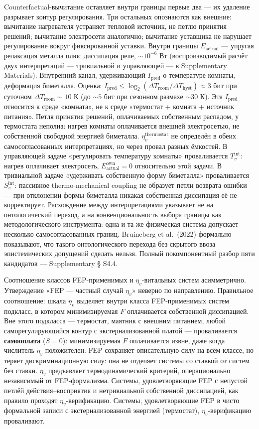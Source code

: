 \documentclass[pdflatex,sn-mathphys-ay]{sn-jnl}
\begin{document}
Counterfactual-вычитание оставляет внутри границы первые два --- их удаление разрывает контур регулирования. Три остальных опознаются как внешние: вычитание нагревателя устраняет тепловой источник, не петлю принятия решений; вычитание электросети аналогично; вычитание уставщика не нарушает регулирование вокруг фиксированной уставки. Внутри границы \(E_{\text{actual}}\) --- упругая релаксация металла плюс диссипация реле, \(\sim 10^{-6}\) Вт (воспроизводимый расчёт двух интерпретаций --- тривиальной и управляющей --- в Supplementary Materials). Внутренний канал, удерживающий \(I_{\text{pred}}\) о температуре комнаты, --- деформация биметалла. Оценка: \(I_{\text{pred}} \le \log_2(\Delta T_{\text{room}}/\Delta T_{\text{hyst}}) \approx 3\) бит при суточном \(\Delta T_{\text{room}} \sim 10\) К (до \(\sim 5\) бит при сезонном размахе \(\sim 30\) К). Эта \(I_{\text{pred}}\) относится к среде «комната», не к среде «термостат + комната + источник питания». Петля принятия решений, оплачиваемых собственным распадом, у термостата неполна: нагрев комнаты оплачивается внешней электросетью, не собственной свободной энергией биметалла. \(\eta_v^{\text{thermostat}}\) не определён в обеих самосогласованных интерпретациях, но через провал разных ёмкостей. В управляющей задаче «регулировать температуру комнаты» проваливается \(T_v^{\text{int}}\): нагрев оплачивает электросеть, \(E_{\text{actual}}^{\text{own}} = 0\) относительно этой задачи. В тривиальной задаче «удерживать собственную форму биметалла» проваливается \(S_v^{\text{int}}\): пассивное thermo-mechanical coupling не образует петли возврата ошибки --- при отклонении формы биметалла никакая собственная диссипация её не корректирует. Расхождение между интерпретациями указывает не на онтологический переход, а на конвенциональность выбора границы как методологического инструмента: одна и та же физическая система допускает несколько самосогласованных границ. Bruineberg et al.~(2022) формально показывают, что такого онтологического перехода без скрытого ввоза эпистемических допущений сделать нельзя. Полный покомпонентный разбор пяти кандидатов --- Supplementary § S4.4.

Соотношение классов FEP-применимых и \(\eta_v\)-витальных систем асимметрично. Утверждение «FEP --- частный случай \(\eta_v\)» неверно по направлению. Правильное соотношение: шкала \(\eta_v\) выделяет внутри класса FEP-применимых систем подкласс, в котором минимизируемая \(F\) оплачивается собственной диссипацией. Вне этого подкласса --- термостат, маятник с внешним питанием, любой саморегулирующийся контур с экстернализованной платой --- проваливается \textbf{самооплата} (\(S = 0\)): минимизируемая \(F\) оплачивается извне, даже когда числитель \(\eta_v\) положителен. FEP сохраняет описательную силу на всём классе, но теряет дискриминационную силу: она не отделяет системы со ставкой от систем без ставки. \(\eta_v\) предъявляет термодинамический критерий, операционально независимый от FEP-формализма. Системы, удовлетворяющие FEP с непустой петлёй действия--восприятия и нетривиальной собственной диссипацией, как правило проходят \(\eta_v\)-верификацию. Системы, удовлетворяющие FEP в чисто формальной записи с экстернализованной энергией (термостат), \(\eta_v\)-верификацию проваливают.
\end{document}
